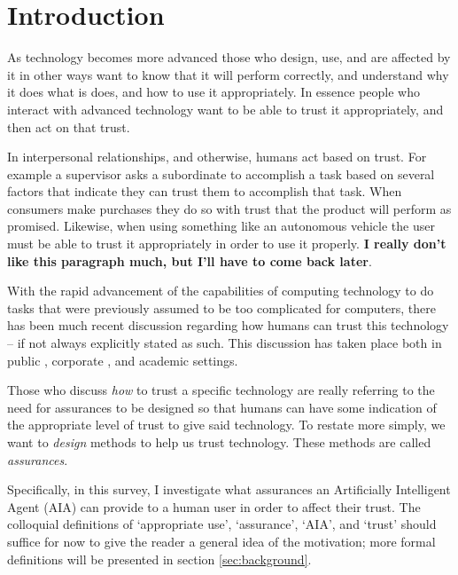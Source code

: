 \section{Introduction}
    As technology becomes more advanced those who design, use, and are affected by it in other ways want to know that it will perform correctly, and understand why it does what is does, and how to use it appropriately. In essence people who interact with advanced technology want to be able to trust it appropriately, and then act on that trust.

    In interpersonal relationships, and otherwise, humans act based on trust. For example a supervisor asks a subordinate to accomplish a task based on several factors that indicate they can trust them to accomplish that task. When consumers make purchases they do so with trust that the product will perform as promised. Likewise, when using something like an autonomous vehicle the user must be able to trust it appropriately in order to use it properly. \textbf{I really don't like this paragraph much, but I'll have to come back later}.

    With the rapid advancement of the capabilities of computing technology to do tasks that were previously assumed to be too complicated for computers, there has been much recent discussion regarding how humans can trust this technology -- if not always explicitly stated as such. This discussion has taken place both in public \cite{Spectrum2016-jv,DeSteno2014-cq,Cranz2017-yh,Cassel2017-tn,Danks_undated-sb}, corporate \cite{Banavar2016-nm, Khosravi2016-ke,Moody2017-vd,Rudnitsky2017-in,Benioff2016-tc}, and academic \cite{Groom2007-bz,Lloyd_undated-bb,Goodrum_2016-fm,Foley2017-qj,Ghahramani2015-yq,Castelvecchi2016-mr} settings.

    Those who discuss \emph{how} to trust a specific technology are really referring to the need for assurances to be designed so that humans can have some indication of the appropriate level of trust to give said technology. To restate more simply, we want to \emph{design} methods to help us trust technology. These methods are called \emph{assurances}.
    
    Specifically, in this survey, I investigate what assurances an Artificially Intelligent Agent (AIA) can provide to a human user in order to affect their trust. The colloquial definitions of `appropriate use', `assurance', `AIA', and `trust' should suffice for now to give the reader a general idea of the motivation; more formal definitions will be presented in section \ref{sec:background}.

